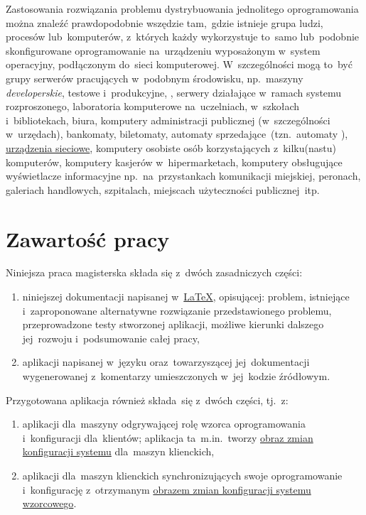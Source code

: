 \documentclass[thesis]{subfiles}
\begin{document}
Zastosowania rozwiązania problemu dystrybuowania jednolitego oprogramowania można znaleźć prawdopodobnie wszędzie tam,~gdzie istnieje grupa ludzi, procesów lub~komputerów, z~których każdy wykorzystuje to~samo lub~podobnie skonfigurowane oprogramowanie na~urządzeniu wyposażonym w~system operacyjny, podłączonym do~sieci komputerowej. W~szczególności mogą to~być grupy serwerów pracujących w~podobnym środowisku, np.~maszyny \emph{developerskie}, testowe i~produkcyjne, , serwery działające w~ramach systemu rozproszonego, laboratoria komputerowe na~uczelniach, w~szkołach i~bibliotekach, biura, komputery administracji publicznej (w~szczególności w~urzędach), bankomaty, biletomaty, automaty sprzedające~(tzn.~automaty ), \href{https://en.wikipedia.org/wiki/Networking_hardware}{urządzenia sieciowe}, komputery osobiste osób korzystających z~kilku(nastu) komputerów, komputery kasjerów w~hipermarketach, komputery obsługujące wyświetlacze informacyjne np.~na~przystankach komunikacji miejskiej, peronach, galeriach handlowych, szpitalach, miejscach użyteczności publicznej~itp.


\section{Zawartość pracy}

\noindent Niniejsza praca magisterska składa się z~dwóch zasadniczych części:\mynobreakpar
\begin{enumerate}
	\item niniejszej dokumentacji napisanej w~\href{https://en.wikipedia.org/wiki/LaTeX}{\LaTeX}, opisującej: problem, istniejące i~zaproponowane alternatywne rozwiązanie przedstawionego problemu, przeprowadzone testy stworzonej aplikacji, możliwe kierunki dalszego jej~rozwoju i~podsumowanie całej pracy,
	\item aplikacji napisanej w~języku \python{} oraz~towarzyszącej jej~dokumentacji wygenerowanej z~komentarzy umieszczonych w~jej~kodzie źródłowym.
\end{enumerate}
Przygotowana aplikacja również składa~się z~dwóch części, tj.~z:\mynobreakpar%
\begin{enumerate}
	\item aplikacji dla~maszyny odgrywającej rolę wzorca oprogramowania i~konfiguracji dla~klientów; aplikacja ta~m.in.~tworzy \hyperref[sec:obraz-zmian-konfiguracji]{obraz zmian konfiguracji systemu} dla~maszyn klienckich,
	\item aplikacji dla~maszyn klienckich synchronizujących swoje oprogramowanie i~konfigurację z~otrzymanym \hyperref[sec:obraz-zmian-konfiguracji]{obrazem zmian konfiguracji systemu wzorcowego}.
\end{enumerate}
\end{document}
